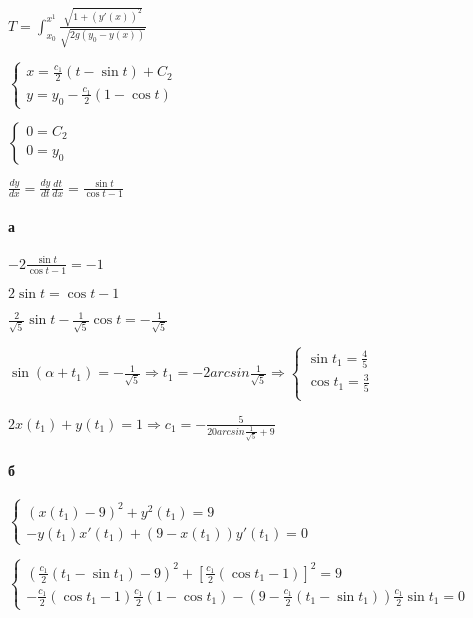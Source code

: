 \documentclass[russian]{article}
\begin{document}
$T=\int_{x_0}^{x^1}\frac{\sqrt{1+(y'(x))^2}}{\sqrt{2g(y_0-y(x))}}$

$\begin{cases}
x=\frac{c_1}{2}(t-\sin t) + C_2 \\
y = y_0 - \frac{c_1}{2}(1 - \cos t)
\end{cases}$

$\begin{cases}
0 = C_2 \\
0 = y_0
\end{cases}$

$\frac{dy}{dx} = \frac{dy}{dt}\frac{dt}{dx} = \frac{\sin t}{\cos t - 1}$

\paragraph*{а}

$-2 \frac{\sin t}{\cos t - 1} = -1$

$2 \sin t = \cos t - 1$

$\frac{2}{\sqrt{5}} \sin t - \frac{1}{\sqrt{5}}\cos t = - \frac{1}{\sqrt{5}}$

$\sin (\alpha + t_1)=-\frac{1}{\sqrt{5}} \Rightarrow t_1 = -2 arcsin \frac{1}{\sqrt{5}}
\Rightarrow 
\begin{cases}
\sin t_1 = \frac{4}{5} \\
\cos t_1 = \frac{3}{5} \\
\end{cases}$

$ 2x(t_1)+y(t_1) = 1 \Rightarrow 	c_1 = -\frac{5}{20 arcsin \frac{1}{\sqrt{5}} + 9}$

\paragraph*{б}

$\begin{cases}
(x(t_1) - 9)^2 + y^2(t_1)=9 \\
-y(t_1) x'(t_1) + (9 - x(t_1))y'(t_1) = 0
\end{cases}$

$\begin{cases}
(\frac{c_1}{2}(t_1-\sin t_1) - 9)^2 + [\frac{c_1}{2}(\cos t_1 - 1)]^2=9 \\
-\frac{c_1}{2}(\cos t_1 - 1) \frac{c_1}{2}(1-\cos t_1) - (9 - \frac{c_1}{2}(t_1-\sin t_1))\frac{c_1}{2}\sin t_1 = 0
\end{cases}$
\end{document}
